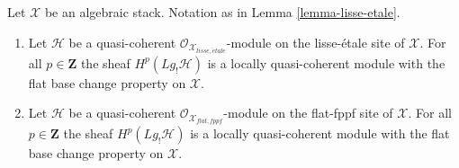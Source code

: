 \begin{lemma}
\label{lemma-higher-shriek-quasi-coherent}
Let $\mathcal{X}$ be an algebraic stack. Notation as in
Lemma \ref{lemma-lisse-etale}.
\begin{enumerate}
\item Let $\mathcal{H}$ be a quasi-coherent
$\mathcal{O}_{\mathcal{X}_{lisse,\acute{e}tale}}$-module 
on the lisse-\'etale site of $\mathcal{X}$. For all $p \in \mathbf{Z}$
the sheaf $H^p(Lg_!\mathcal{H})$ is a locally quasi-coherent module with
the flat base change property on $\mathcal{X}$.
\item Let $\mathcal{H}$ be a quasi-coherent
$\mathcal{O}_{\mathcal{X}_{flat,fppf}}$-module 
on the flat-fppf site of $\mathcal{X}$. For all $p \in \mathbf{Z}$
the sheaf $H^p(Lg_!\mathcal{H})$ is a locally quasi-coherent module with the
flat base change property on $\mathcal{X}$.
\end{enumerate}
\end{lemma}

